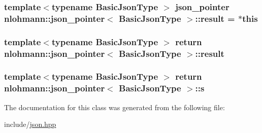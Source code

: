 \subsubsection[{\texorpdfstring{result}{result}}]{\setlength{\rightskip}{0pt plus 5cm}template$<$typename Basic\+Json\+Type $>$ {\bf json\+\_\+pointer} {\bf nlohmann\+::json\+\_\+pointer}$<$ Basic\+Json\+Type $>$\+::result = $\ast$this\hspace{0.3cm}{\ttfamily [private]}}\hypertarget{classnlohmann_1_1json__pointer_ae3d35f4085faec07b87c88ba0dae457d}{}\label{classnlohmann_1_1json__pointer_ae3d35f4085faec07b87c88ba0dae457d}
\subsubsection[{\texorpdfstring{result}{result}}]{\setlength{\rightskip}{0pt plus 5cm}template$<$typename Basic\+Json\+Type $>$ return {\bf nlohmann\+::json\+\_\+pointer}$<$ Basic\+Json\+Type $>$\+::result\hspace{0.3cm}{\ttfamily [private]}}\hypertarget{classnlohmann_1_1json__pointer_a8473b794a810d3fdb46cf985bfa9e2bb}{}\label{classnlohmann_1_1json__pointer_a8473b794a810d3fdb46cf985bfa9e2bb}
\subsubsection[{\texorpdfstring{s}{s}}]{\setlength{\rightskip}{0pt plus 5cm}template$<$typename Basic\+Json\+Type $>$ return {\bf nlohmann\+::json\+\_\+pointer}$<$ Basic\+Json\+Type $>$\+::s\hspace{0.3cm}{\ttfamily [private]}}\hypertarget{classnlohmann_1_1json__pointer_a40846302040a443256386bfa258ea061}{}\label{classnlohmann_1_1json__pointer_a40846302040a443256386bfa258ea061}


The documentation for this class was generated from the following file\+:\begin{DoxyCompactItemize}
\item 
include/\hyperlink{json_8hpp}{json.\+hpp}\end{DoxyCompactItemize}

